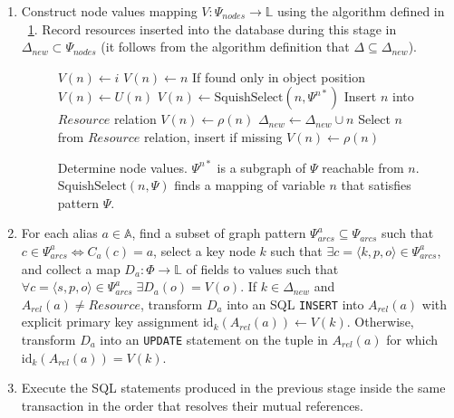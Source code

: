 \documentclass[conference,letterpaper]{IEEEtran}
\begin{document}
\begin{enumerate}


\item Construct node values mapping $V: \Psi_{nodes} \to \mathbb{L}$
using the algorithm defined in \figurename~\ref{node-values}. Record
resources inserted into the database during this stage in $\Delta_{new}
\subset \Psi_{nodes}$ (it follows from the algorithm definition that
$\Delta \subseteq \Delta_{new}$).

\begin{figure}
\begin{algorithmic}[1]

    \State $V(n) \gets i$
    \State $V(n) \gets n$
      \State \Comment If found only in object position
      \State $V(n) \gets U(n)$
    \Else
        \State $V(n) \gets \mathrm{SquishSelect}(n, \Psi^{n*})$
      \EndIf
        \State Insert $n$ into $Resource$ relation
        \State $V(n) \gets \rho(n)$
        \State $\Delta_{new} \gets \Delta_{new} \cup n$
      \EndIf
    \EndIf
    \State Select $n$ from $Resource$ relation, insert if missing
    \State $V(n) \gets \rho(n)$ 
  \EndIf
\EndFor

\end{algorithmic}
\caption{Determine node values. $\Psi^{n*}$ is a subgraph of $\Psi$
reachable from $n$. $\mathrm{SquishSelect}(n, \Psi)$ finds a mapping of
variable $n$ that satisfies pattern $\Psi$.}
\label{node-values}
\end{figure}


\item For each alias $a \in \mathbb{A}$, find a subset of graph pattern
$\Psi_{arcs}^a \subseteq \Psi_{arcs}$ such that $c \in \Psi_{arcs}^a
\iff C_a(c) = a$, select a key node $k$ such that $\exists c = \langle
k, p, o \rangle \in \Psi_{arcs}^a$, and collect a map $D_a: \Phi \to
\mathbb{L}$ of fields to values such that $\forall c = \langle s, p, o
\rangle \in \Psi_{arcs}^a \; \exists D_a(o) = V(o)$. If $k \in
\Delta_{new}$ and $A_{rel}(a) \not= Resource$, transform $D_a$ into an
SQL {\tt INSERT} into $A_{rel}(a)$ with explicit primary key assignment
$\mathrm{id}_k(A_{rel}(a)) \gets V(k)$. Otherwise, transform $D_a$
into an {\tt UPDATE} statement on the tuple in $A_{rel}(a)$ for which
$\mathrm{id}_k(A_{rel}(a)) = V(k)$.


\item Execute the SQL statements produced in the previous stage inside
the same transaction in the order that resolves their mutual references.

\end{enumerate}
\end{document}
